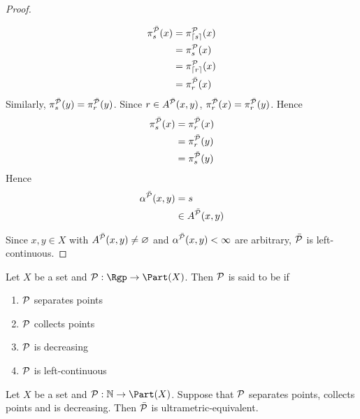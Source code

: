 \documentclass{book}
\begin{document}
\begin{proof}
\begin{itemize}
\begin{align*}
			\pi_s^{\bar{\mathcal{P}}}(x) 
			& = \pi_{\lceil s \rceil }^{\mathcal{P}}(x) \\
			& = \pi_{s }^{\mathcal{P}}(x) \\
			& = \pi_{\lceil r \rceil }^{\mathcal{P}}(x) \\
			& = \pi_r^{\bar{\mathcal{P}}}(x)
		\end{align*}
		Similarly, $\pi_s^{\bar{\mathcal{P}}}(y) = \pi_r^{\bar{\mathcal{P}}}(y)$. Since $r \in A^{\bar{\mathcal{P}}}(x,y)$, $\pi_r^{\bar{\mathcal{P}}}(x) = \pi_r^{\bar{\mathcal{P}}}(y)$. Hence
		\begin{align*}
			\pi_s^{\bar{\mathcal{P}}}(x) 
			& = \pi_r^{\bar{\mathcal{P}}}(x) \\
			& = \pi_r^{\bar{\mathcal{P}}}(y) \\
			& = \pi_s^{\bar{\mathcal{P}}}(y) 
		\end{align*}
		Hence 
		\begin{align*}
			\alpha^{\bar{\mathcal{P}}}(x,y)
			& = s \\
			& \in A^{\bar{\mathcal{P}}}(x,y)
		\end{align*}
	\end{itemize} 
	Since $x,y \in X$ with $A^{\bar{\mathcal{P}}}(x,y) \neq \varnothing$ and $\alpha^{\bar{\mathcal{P}}}(x,y) < \infty$ are arbitrary, $\bar{\mathcal{P}}$ is left-continuous.
\end{proof}

\begin{defn}
	Let $X$ be a set and $\MP: \Rgp \rightarrow \Part(X)$. Then $\mathcal{P}$ is said to be  if 
	\begin{enumerate}
		\item $\mathcal{P}$ separates points
		\item $\mathcal{P}$ collects points
		\item $\mathcal{P}$ is decreasing 
		\item $\mathcal{P}$ is left-continuous
	\end{enumerate}
\end{defn}

\begin{ex}
	Let $X$ be a set and $\MP: \N \rightarrow \Part(X)$. Suppose that $\mathcal{P}$ separates points, collects points and is decreasing. Then $\bar{\mathcal{P}}$ is ultrametric-equivalent.
\end{ex}
\end{document}
